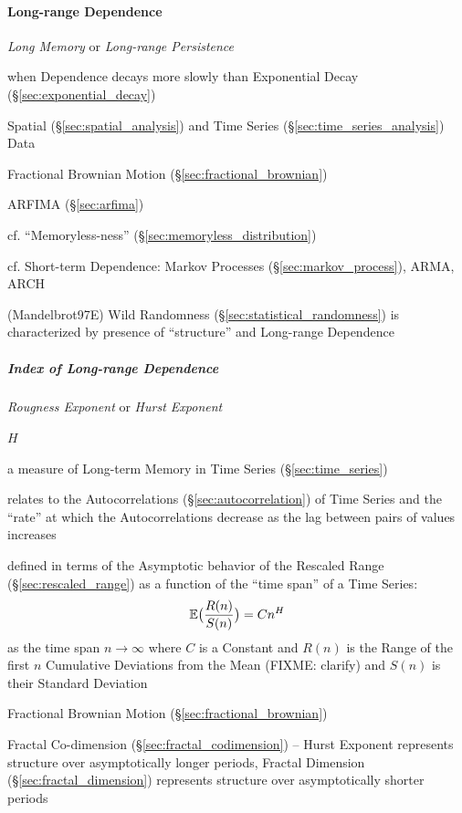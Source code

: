 \paragraph{Long-range Dependence}\label{sec:long_range_dependence}\hfill

\emph{Long Memory} or \emph{Long-range Persistence}

when Dependence decays more slowly than Exponential Decay
(\S\ref{sec:exponential_decay})

Spatial (\S\ref{sec:spatial_analysis}) and Time Series
(\S\ref{sec:time_series_analysis}) Data

\fist Fractional Brownian Motion (\S\ref{sec:fractional_brownian})

\fist ARFIMA (\S\ref{sec:arfima})

cf. ``Memoryless-ness'' (\S\ref{sec:memoryless_distribution})

cf. Short-term Dependence: Markov Processes (\S\ref{sec:markov_process}), ARMA,
ARCH

(Mandelbrot97E) Wild Randomness (\S\ref{sec:statistical_randomness}) is
characterized by presence of ``structure'' and Long-range Dependence



\subparagraph{Index of Long-range Dependence}\label{sec:hurst_exponent}\hfill

\emph{Rougness Exponent} or \emph{Hurst Exponent}

$H$

a measure of Long-term Memory in Time Series (\S\ref{sec:time_series})

relates to the Autocorrelations (\S\ref{sec:autocorrelation}) of Time Series and
the ``rate'' at which the Autocorrelations decrease as the lag between pairs of
values increases

defined in terms of the Asymptotic behavior of the Rescaled Range
(\S\ref{sec:rescaled_range}) as a function of the ``time span'' of a Time
Series:
\[
  \mathbb{E}\big(\frac{R(n)}{S(n)}\big) = Cn^H
\]
as the time span $n \to \infty$ where $C$ is a Constant and $R(n)$ is the Range
of the first $n$ Cumulative Deviations from the Mean (FIXME: clarify) and $S(n)$
is their Standard Deviation

Fractional Brownian Motion (\S\ref{sec:fractional_brownian})

Fractal Co-dimension (\S\ref{sec:fractal_codimension}) -- Hurst Exponent
represents structure over asymptotically longer periods, Fractal Dimension
(\S\ref{sec:fractal_dimension}) represents structure over asymptotically shorter
periods

